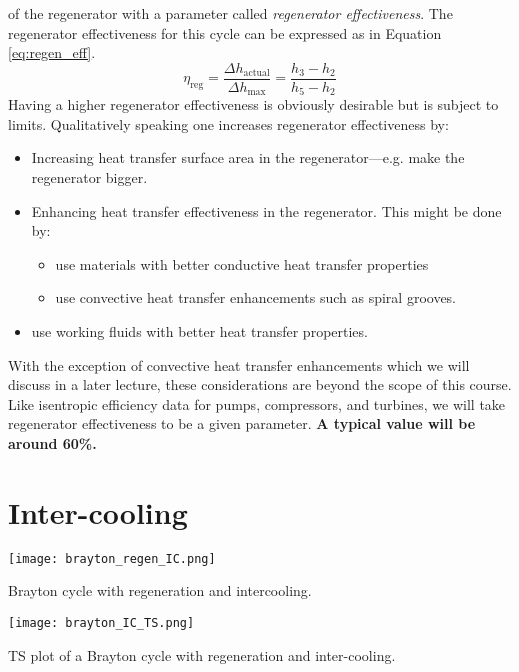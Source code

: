  of the regenerator with a parameter called \emph{regenerator effectiveness}.  The regenerator effectiveness for this cycle can be expressed as in Equation \ref{eq:regen_eff}.
\begin{equation}
\eta_{\text{reg}} = \frac{\Delta h_{\text{actual}}}{\Delta h_{\text{max}}} = \frac{h_3 - h_2}{h_5 - h_2}
\label{eq:regen_eff}
\end{equation}
Having a higher regenerator effectiveness is obviously desirable but is subject to limits.  Qualitatively speaking one increases regenerator effectiveness by:
\begin{itemize}
\item Increasing heat transfer surface area in the regenerator---e.g. make the regenerator bigger.
\item Enhancing heat transfer effectiveness in the regenerator. This might be done by:
\begin{itemize}
\item use materials with better conductive heat transfer properties
\item use convective heat transfer enhancements such as spiral grooves.  
\end{itemize}
\item use working fluids with better heat transfer properties.
\end{itemize}
With the exception of convective heat transfer enhancements which we will discuss in a later lecture, these considerations are beyond the scope of this course. Like isentropic efficiency data for pumps, compressors, and turbines, we will take regenerator effectiveness to be a given parameter.  \textbf{A typical value will be around 60\%.}

\section{Inter-cooling} 
\begin{marginfigure}
\texttt{[image: brayton\_regen\_IC.png]}
\caption{Brayton cycle with regeneration and intercooling.}
\label{fig:brayton_regen_IC}
\end{marginfigure}

\begin{marginfigure}
\texttt{[image: brayton\_IC\_TS.png]}
\caption{TS plot of a Brayton cycle with regeneration and inter-cooling.}
\label{fig:brayton_IC_TS}
\end{marginfigure}

